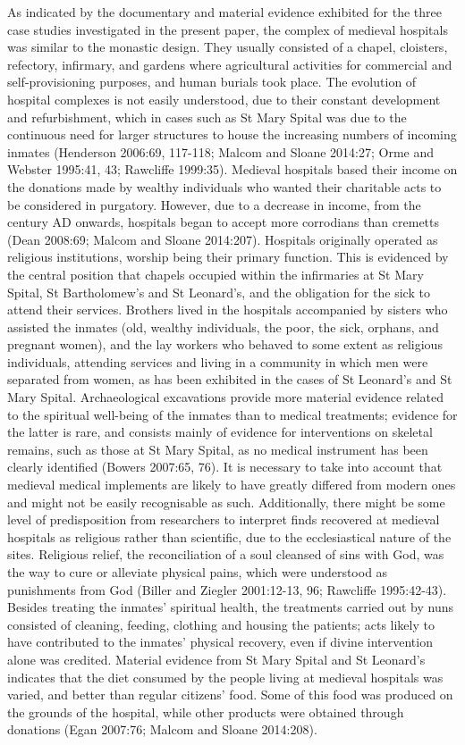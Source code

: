 \documentclass[%
	]{ijsra}
\begin{document}
As indicated by the documentary and material evidence exhibited for the three case studies investigated in the present paper, the complex of medieval hospitals was similar to the monastic design. They usually consisted of a chapel, cloisters, refectory, infirmary, and gardens where agricultural activities for commercial and self-provisioning purposes, and human burials took place. The evolution of hospital complexes is not easily understood, due to their constant development and refurbishment, which in cases such as St Mary Spital was due to the continuous need for larger structures to house the increasing numbers of incoming inmates (Henderson 2006:69, 117-118; Malcom and Sloane 2014:27; Orme and Webster 1995:41, 43; Rawcliffe 1999:35).
Medieval hospitals based their income on the donations made by wealthy individuals who wanted their charitable acts to be considered in purgatory. However, due to a decrease in income, from the  century AD onwards, hospitals began to accept more corrodians than cremetts (Dean 2008:69; Malcom and Sloane 2014:207). 
Hospitals originally operated as religious institutions, worship being their primary function. This is evidenced by the central position that chapels occupied within the infirmaries at St Mary Spital, St Bartholomew’s and St Leonard’s, and the obligation for the sick to attend their services. Brothers lived in the hospitals accompanied by sisters who assisted the inmates (old, wealthy individuals, the poor, the sick, orphans, and pregnant women), and the lay workers who behaved to some extent as religious individuals, attending services and living in a community in which men were separated from women, as has been exhibited in the cases of St Leonard’s and St Mary Spital. 
Archaeological excavations provide more material evidence related to the spiritual well-being of the inmates than to medical treatments; evidence for the latter is rare, and consists mainly of evidence for interventions on skeletal remains, such as those at St Mary Spital, as no medical instrument has been clearly identified (Bowers 2007:65, 76). 
It is necessary to take into account that medieval medical implements are likely to have greatly differed from modern ones and might not be easily recognisable as such. Additionally, there might be some level of predisposition from researchers to interpret finds recovered at medieval hospitals as religious rather than scientific, due to the ecclesiastical nature of the sites. 
Religious relief, the reconciliation of a soul cleansed of sins with God, was the way to cure or alleviate physical pains, which were understood as punishments from God (Biller and Ziegler 2001:12-13, 96; Rawcliffe 1995:42-43). Besides treating the inmates’ spiritual health, the treatments carried out by nuns consisted of cleaning, feeding, clothing and housing the patients; acts likely to have contributed to the inmates’ physical recovery, even if divine intervention alone was credited. Material evidence from St Mary Spital and St Leonard’s indicates that the diet consumed by the people living at medieval hospitals was varied, and better than regular citizens’ food. Some of this food was produced on the grounds of the hospital, while other products were obtained through donations (Egan 2007:76; Malcom and Sloane 2014:208).
\end{document}
